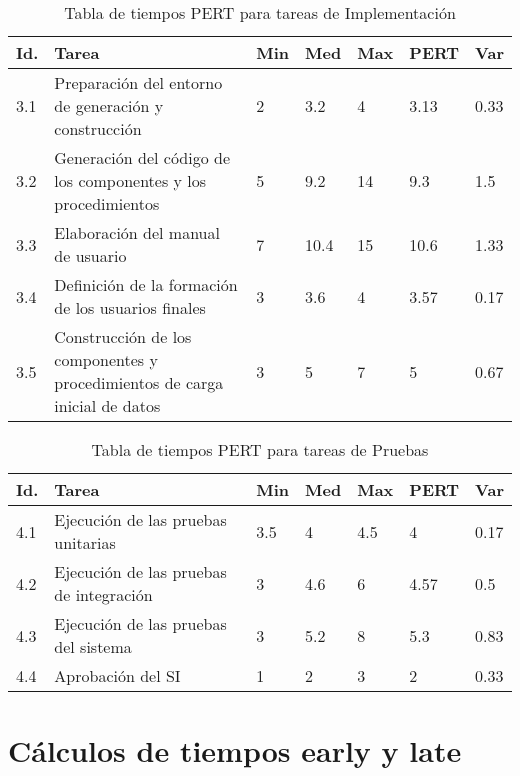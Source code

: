 \documentclass[11pt,a4paper,spanish,twoside]{report}
\begin{document}
\begin{table}[!h]
\centering
  \begin{tabular}{|p{0.8cm}||p{4cm}||p{0.75cm}|p{0.75cm}|p{0.75cm}|p{1.10cm}|
p{0.75cm}|}
    \hline
    \textbf{Id.} & \textbf{Tarea} & \textbf{Min} &
    \textbf{Med} & \textbf{Max} & \textbf{PERT} & \textbf{Var}\\
    \hline
    3.1 & Preparación del entorno de generación y construcción & 2 & 3.2  & 4
    & 3.13 & 0.33\\
    \hline
    3.2 & Generación del código de los componentes y los procedimientos & 5 &
    9.2 & 14 & 9.3 & 1.5\\
    \hline
    3.3 & Elaboración del manual de usuario & 7 & 10.4 & 15 & 10.6 & 1.33\\
    \hline
    3.4 & Definición de la formación de los usuarios finales & 3 & 3.6 & 4
    &3.57 & 0.17\\
    \hline
    3.5 & Construcción de los componentes y procedimientos de carga inicial
    de datos & 3 & 5 & 7 & 5 & 0.67\\
    \hline
  \end{tabular}
  \caption{Tabla de tiempos PERT para tareas de
    Implementación} \label{Tab:tareas3}
\end{table}

\begin{table}[!h]
\centering
  \begin{tabular}{|p{0.8cm}||p{4cm}||p{0.75cm}|p{0.75cm}|p{0.75cm}|p{1.10cm}|
p{0.75cm}|}
    \hline
    \textbf{Id.} & \textbf{Tarea} & \textbf{Min} &
    \textbf{Med} & \textbf{Max} & \textbf{PERT} & \textbf{Var}\\
    \hline
    4.1 & Ejecución de las pruebas unitarias & 3.5 & 4 & 4.5 & 4 & 0.17\\
    \hline
    4.2 & Ejecución de las pruebas de integración & 3 & 4.6 & 6 & 4.57 & 0.5\\
    \hline
    4.3 & Ejecución de las pruebas del sistema & 3 & 5.2 & 8 & 5.3 & 0.83\\
    \hline
    4.4 & Aprobación del SI & 1 & 2 & 3 & 2 & 0.33\\
    \hline
  \end{tabular}
  \caption{Tabla de tiempos PERT para tareas de Pruebas} \label{Tab:tareas4}
\end{table}

\section{Cálculos de tiempos early y late}
\end{document}
